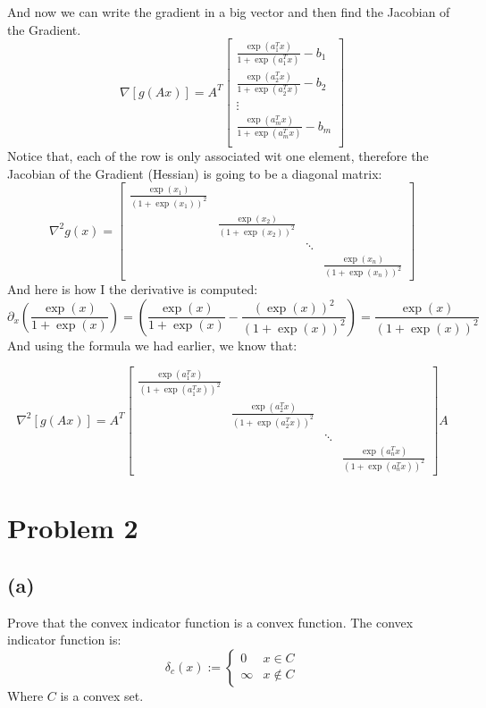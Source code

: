\documentclass[]{article}
\begin{document}
    And now we can write the gradient in a big vector and then find the Jacobian of the Gradient.
    $$
    \nabla [g(Ax)] =
    A^T
    \begin{bmatrix}
        \frac{\exp(a_1^Tx)}{1 + \exp(a_1^Tx)} - b_1 \\[0.5em]
        \frac{\exp(a_2^Tx)}{1 + \exp(a_2^Tx)} - b_2 \\[0.5em]
        \vdots \\[0.5em]
        \frac{\exp(a_m^Tx)}{1 + \exp(a_m^Tx)} - b_m \\[0.5em]
    \end{bmatrix}
    $$
    Notice that, each of the row is only associated wit one element, therefore the Jacobian of the Gradient (Hessian) is going to be a diagonal matrix:
    $$
    \nabla^2g(x) =
        \begin{bmatrix}
        \frac{\exp(x_1)}{(1 + \exp(x_1))^2}    & & & \\
        & \frac{\exp(x_2)}{(1 + \exp(x_2))^2} & & \\
        & & \ddots & \\
        & & & \frac{\exp(x_n)}{(1 + \exp(x_n))^2}
        \end{bmatrix}
    $$
    And here is how I the derivative is computed:
    $$
    \partial_x
    \left(
        \frac{\exp(x)}{1 + \exp(x)}
    \right)
     =
     \left(
     \frac{\exp(x)}{1 + \exp(x)}
     -
     \frac{(\exp(x))^2}{(1 + \exp(x))^2}
     \right) =
     \frac{\exp(x)}{(1 + \exp(x))^2}
    $$
    And using the formula we had earlier, we know that:

    $$
    \nabla^2[g(Ax)]
    =
    A^T \begin{bmatrix}
            \frac{\exp(a_1^T x)}{(1 + \exp(a_1^T x))^2}    & & & \\
            & \frac{\exp(a_2^T x)}{(1 + \exp(a_2^T x))^2} & & \\
            & & \ddots & \\
            & & & \frac{\exp(a_n^T x)}{(1 + \exp(a_n^T x))^2}
        \end{bmatrix}
        A
    $$


\newpage
\section*{Problem 2}
\subsection*{(a)}
    \hspace{1.1em}
    Prove that the convex indicator function is a convex function. The convex indicator function is:
        \begin{equation*}\tag{2.a.1}\label{eqn:2.a.1}
            \delta_c(x) :=
        \begin{cases}
        0 & x \in C \\ \infty & x\not\in C
        \end{cases}
        \end{equation*}
    Where $C$ is a convex set.
    
\end{document}
